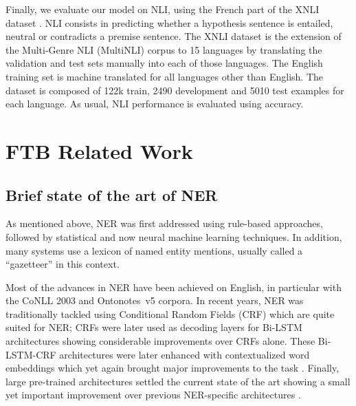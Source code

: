 Finally, we evaluate our model on NLI, using the French part of the XNLI dataset \cite{conneau-etal-2018-xnli}. NLI consists in predicting whether a hypothesis sentence is entailed, neutral or contradicts a premise sentence. The XNLI dataset is the extension of the Multi-Genre NLI (MultiNLI) corpus \cite{williams-etal-2018-broad} to 15 languages by translating the validation and test sets manually into each of those languages.
The English training set is machine translated for all languages other than English.
The dataset is composed of 122k train, 2490 development and 5010 test examples for each language. As usual, NLI performance is evaluated using accuracy.

\section{FTB Related Work}


\subsection{Brief state of the art of NER}
\label{subsec:sota}

As mentioned above, NER was first addressed using rule-based approaches, followed by statistical and now neural machine learning techniques. In addition, many systems use a lexicon of named entity mentions, usually called a ``gazetteer'' in this context.

Most of the advances in NER  have been achieved on English, in particular with the CoNLL 2003 \cite{tjong-kim-sang-de-meulder-2003-introduction} and  Ontonotes~v5 \cite{pradhan-etal-2012-conll,pradhan-etal-2013-towards} corpora. In recent years, NER was traditionally tackled using Conditional Random Fields (CRF) \cite{lafferty-etal-2001-conditional} which are quite suited for NER; CRFs were later used as decoding layers for Bi-LSTM architectures \cite{huang-etal-2015-bidirectional,lample-etal-2016-neural} showing considerable improvements over CRFs alone. These Bi-LSTM-CRF architectures were later enhanced with contextualized word embeddings which yet again brought major improvements to the task \cite{peters-etal-2018-deep,akbik-etal-2018-contextual}. Finally, large pre-trained architectures settled the current state of the art showing a small yet important improvement over previous NER-specific architectures \cite{devlin-etal-2019-bert,baevski-etal-2019-cloze}.

